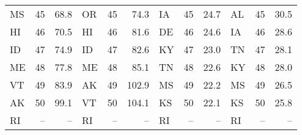 \begin{longtable}{lrr|lrr||lrr|lrr}
        MS &   45 &  68.8 &            OR &   45 &   74.3 &             IA &   45 &   24.7 &            AL &   45 &   30.5 \\
        HI &   46 &  70.5 &            HI &   46 &   81.6 &             DE &   46 &   24.6 &            IA &   46 &   28.6 \\
        ID &   47 &  74.9 &            ID &   47 &   82.6 &             KY &   47 &   23.0 &            TN &   47 &   28.1 \\
        ME &   48 &  77.8 &            ME &   48 &   85.1 &             TN &   48 &   22.6 &            KY &   48 &   28.0 \\
        VT &   49 &  83.9 &            AK &   49 &  102.9 &             MS &   49 &   22.2 &            MS &   49 &   26.5 \\
        AK &   50 &  99.1 &            VT &   50 &  104.1 &             KS &   50 &   22.1 &            KS &   50 &   25.8 \\
        RI &   -- &    -- &            RI &   -- &     -- &             RI &   -- &     -- &            RI &   -- &     -- \\
        
\end{longtable}